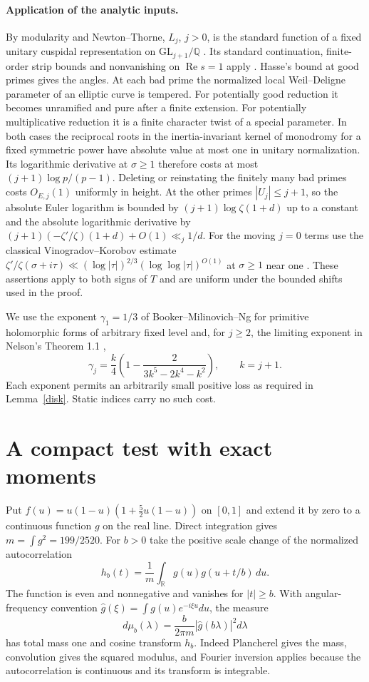 \documentclass[11pt]{article}
\newcommand{\R}{\mathbb R}\newcommand{\Q}{\mathbb Q}\newcommand{\C}{\mathbb C}\newcommand{\Z}{\mathbb Z}
\newcommand{\GL}{\mathrm{GL}}\newcommand{\Sym}{\mathrm{Sym}}\newcommand{\re}{\operatorname{Re}}\newcommand{\im}{\operatorname{Im}}
\begin{document}
\paragraph{Application of the analytic inputs.}
By modularity and Newton--Thorne, $L_j$, $j>0$, is the standard function of a fixed unitary cuspidal representation on $\GL_{j+1}/\Q$ \cite{BCDT,NT}. Its standard continuation, finite-order strip bounds and nonvanishing on $\re s=1$ apply \cite{JS}. Hasse's bound at good primes gives the angles. At each bad prime the normalized local Weil--Deligne parameter of an elliptic curve is tempered. For potentially good reduction it becomes unramified and pure after a finite extension. For potentially multiplicative reduction it is a finite character twist of a special parameter. In both cases the reciprocal roots in the inertia-invariant kernel of monodromy for a fixed symmetric power have absolute value at most one in unitary normalization. Its logarithmic derivative at $\sigma\ge1$ therefore costs at most $(j+1)\log p/(p-1)$. Deleting or reinstating the finitely many bad primes costs $O_{E,j}(1)$ uniformly in height. At the other primes $|U_j|\le j+1$, so the absolute Euler logarithm is bounded by $(j+1)\log\zeta(1+d)$ up to a constant and the absolute logarithmic derivative by $(j+1)(-\zeta'/\zeta)(1+d)+O(1)\ll_j1/d$. For the moving $j=0$ terms use the classical Vinogradov--Korobov estimate $\zeta'/\zeta(\sigma+i\tau)\ll(\log|\tau|)^{2/3}(\log\log|\tau|)^{O(1)}$ at $\sigma\ge1$ near one \cite{Titch}. These assertions apply to both signs of $T$ and are uniform under the bounded shifts used in the proof.
 
We use the exponent $\gamma_1=1/3$ of Booker--Milinovich--Ng for primitive holomorphic forms of arbitrary fixed level and, for $j\ge2$, the limiting exponent in Nelson's Theorem 1.1 \cite{BMN,Nelson},
\[
 \gamma_j=\frac{k}{4}\left(1-\frac{2}{3k^5-2k^4-k^2}\right),\qquad k=j+1 .
\]
Each exponent permits an arbitrarily small positive loss as required in Lemma~\ref{disk}. Static indices carry no such cost.


\section{A compact test with exact moments}
Put $f(u)=u(1-u)(1+\tfrac52u(1-u))$ on $[0,1]$ and extend it by zero to a continuous function $g$ on the real line. Direct integration gives $m=\int g^2=199/2520$. For $b>0$ take the positive scale change of the normalized autocorrelation
\[
  h_b(t)=\frac1m\int_{\R}g(u)g(u+t/b)\,du .
\]
The function is even and nonnegative and vanishes for $|t|\ge b$. With angular-frequency convention $\widehat g(\xi)=\int g(u)e^{-i\xi u}du$, the measure
\[
 d\mu_b(\lambda)=\frac{b}{2\pi m}|\widehat g(b\lambda)|^2d\lambda
\]
has total mass one and cosine transform $h_b$. Indeed Plancherel gives the mass, convolution gives the squared modulus, and Fourier inversion applies because the autocorrelation is continuous and its transform is integrable.
\end{document}
